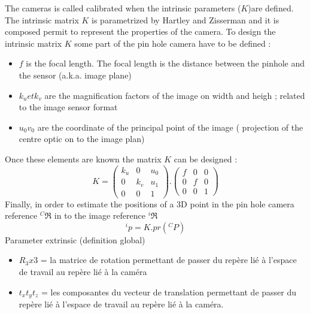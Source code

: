 The cameras is called calibrated when the intrinsic parameters ($K$)are defined.  
 The intrinsic matrix $K$ is parametrized by Hartley and Zisserman and it is composed permit to represent the properties of the camera. To design the intrinsic matrix $K$ some part of the pin hole camera have to be defined :\\
  \begin{itemize}
  
 	\item $f$ is  the focal length. The focal length is the distance between the pinhole and the sensor (a.k.a. image plane)
  	\item $k_u et k_v$ are the magnification factors of the image on width and heigh ; related to the image sensor format%
  	\item $u_0 v_0$  are the coordinate  of  the principal point of the image ( projection of the centre optic on to the image plan)  %
  	  \end{itemize}
Once these elements are known the matrix $K$ can be designed :
\begin{equation}
K=
\begin{pmatrix}
k_u 	& 0 	& u_0 \\
0 		& k_v	& u_1\\
0 		&	0	& 1
\end{pmatrix} .
\begin{pmatrix}
f 		& 0 	& 0  \\
0 		& f		& 0  \\
0 		&	0	& 1  
\end{pmatrix} 
\label{eq:K}
\end{equation}
Finally, in order to estimate the positions of a 3D point in the pin hole camera reference $^C\Re$ in to the image reference $^i\Re$ 
$$
^ip=K.pr(^CP)
$$ 	  
 Parameter extrinsic (definition global) \\
 \begin{itemize}
 	\item$R_3x3$ = la matrice de rotation permettant de passer du repère lié à l'espace de travail au repère lié à la caméra\\
 	\item$t_x t_y t_z$ = les composantes du vecteur de translation permettant de passer du repère lié à l'espace de travail au repère lié à la caméra.\\
 	\end{itemize}
 
